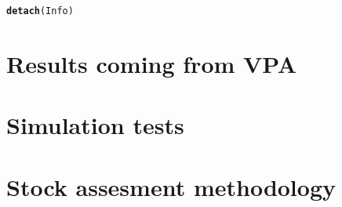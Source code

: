 \documentclass[a4paper]{article}\usepackage{graphicx, color}
\makeatletter
\newcommand{\hlfunctioncall}[1]{\textcolor[rgb]{0.501960784313725,0,0.329411764705882}{\textbf{#1}}}%
\newenvironment{kframe}{%
 \def\at@end@of@kframe{}%
 \ifinner\ifhmode%
  \def\at@end@of@kframe{\end{minipage}}%
  \begin{minipage}{\columnwidth}%
 \fi\fi%
 \def\FrameCommand##1{\hskip\@totalleftmargin \hskip-\fboxsep
 \colorbox{shadecolor}{##1}\hskip-\fboxsep
     \hskip-\linewidth \hskip-\@totalleftmargin \hskip\columnwidth}%
 \MakeFramed {\advance\hsize-\width
   \@totalleftmargin\z@ \linewidth\hsize
   \@setminipage}}%
 {\par\unskip\endMakeFramed%
 \at@end@of@kframe}
\newenvironment{knitrout}{}{} %
\makeatother
\begin{document}
\begin{knitrout}
\color{fgcolor}\begin{kframe}
\begin{alltt}
\hlfunctioncall{detach}(Info)
\end{alltt}
\end{kframe}
\end{knitrout}


\section{Results coming from VPA}
\section{Simulation tests}
\section{Stock assesment methodology}


\end{document}
